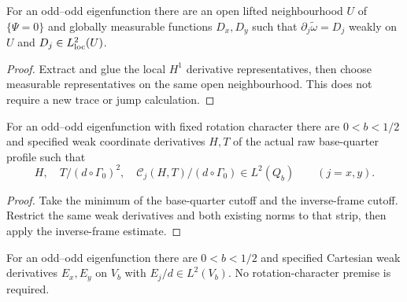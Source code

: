 \begin{lemma}
\label{lem:dd-separatrix-weak-gradient}
\leanok
For an odd--odd eigenfunction there are an open lifted neighbourhood
$U$ of $\{\Psi=0\}$ and globally measurable functions $D_x,D_y$
such that $\partial_j\widetilde\omega=D_j$ weakly on $U$ and
$D_j\in L^2_{\rm loc}(U)$.
\end{lemma}

\begin{proof}
\leanok
Extract and glue the local $H^1$ derivative representatives, then
choose measurable representatives on the same open neighbourhood.
This does not require a new trace or jump calculation.
\end{proof}

\begin{lemma}
\label{lem:dd-base-quarter-inverse-frame}
\leanok
For an odd--odd eigenfunction with fixed rotation character there
are $0<b<1/2$ and specified weak coordinate derivatives $H,T$ of
the actual raw base-quarter profile such that
\[
 H,\quad T/(d\circ\Gamma_0)^2,\quad
 \mathcal C_j(H,T)/(d\circ\Gamma_0)\in L^2(Q_b)
 \qquad(j=x,y).
\]
\end{lemma}

\begin{proof}
\leanok
Take the minimum of the base-quarter cutoff and the inverse-frame
cutoff. Restrict the same weak derivatives and both existing norms
to that strip, then apply the inverse-frame estimate.
\end{proof}

\begin{lemma}
\label{lem:dd-base-quarter-spatial-gradient}
\leanok
For an odd--odd eigenfunction there are $0<b<1/2$ and specified
Cartesian weak derivatives $E_x,E_y$ on $V_b$ with
$E_j/d\in L^2(V_b)$. No rotation-character premise is required.
\end{lemma}

